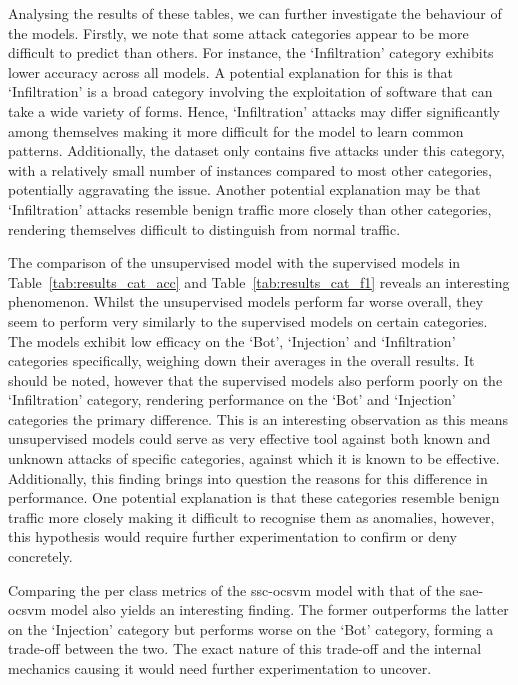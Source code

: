 Analysing the results of these tables, we can further investigate the behaviour
of the models. Firstly, we note that some attack categories appear to be more
difficult to predict than others. For instance, the `Infiltration' category
exhibits lower accuracy across all models. A potential explanation for this is
that `Infiltration' is a broad category involving the exploitation of software
that can take a wide variety of forms. Hence, `Infiltration' attacks may differ
significantly among themselves making it more difficult for the model to learn
common patterns. Additionally, the dataset only contains five attacks under
this category, with a relatively small number of instances compared to most
other categories, potentially aggravating the issue. Another potential
explanation may be that `Infiltration' attacks resemble benign traffic more
closely than other categories, rendering themselves difficult to distinguish
from normal traffic.

The comparison of the unsupervised model with the supervised models in
Table~\ref{tab:results_cat_acc} and Table~\ref{tab:results_cat_f1} reveals an
interesting phenomenon. Whilst the unsupervised models perform far worse
overall, they seem to perform very similarly to the supervised models on
certain categories. The models exhibit low efficacy on the `Bot', `Injection'
and `Infiltration' categories specifically, weighing down their averages in the
overall results. It should be noted, however that the supervised models also
perform poorly on the `Infiltration' category, rendering performance on the
`Bot' and `Injection' categories the primary difference. This is an interesting
observation as this means unsupervised models could serve as very effective
tool against both known and unknown attacks of specific categories, against
which it is known to be effective. Additionally, this finding brings into
question the reasons for this difference in performance. One potential
explanation is that these categories resemble benign traffic more closely
making it difficult to recognise them as anomalies, however, this hypothesis
would require further experimentation to confirm or deny concretely.

Comparing the per class metrics of the \gls{ssc}-\gls{ocsvm} model with that of
the \gls{sae}-\gls{ocsvm} model also yields an interesting finding. The former
outperforms the latter on the `Injection' category but performs worse on the
`Bot' category, forming a trade-off between the two. The exact nature of this
trade-off and the internal mechanics causing it would need further
experimentation to uncover.


